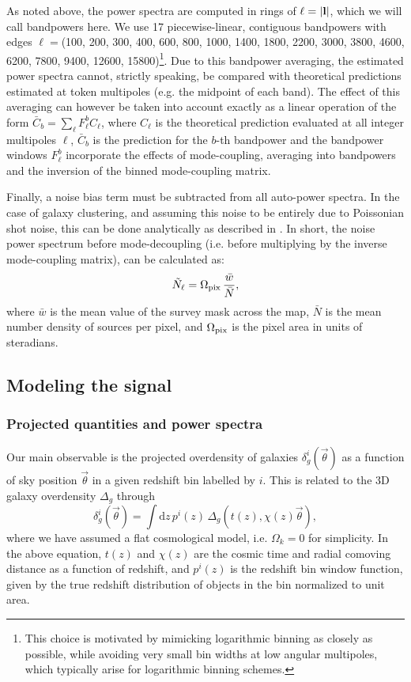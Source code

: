 \documentclass[a4paper,11pt]{article}
\newcommand{\nv}{\vec{\theta}}
\begin{document}
    As noted above, the power spectra are computed in rings of $\ell=|{\bf l}|$, which we will call bandpowers here. We use 17 piecewise-linear, contiguous bandpowers with edges $\ell=$(100, 200, 300, 400, 600, 800, 1000, 1400, 1800, 2200, 3000, 3800, 4600, 6200, 7800, 9400, 12600, 15800)\footnote{This choice is motivated by mimicking logarithmic binning as closely as possible, while avoiding very small bin widths at low angular multipoles, which typically arise for logarithmic binning schemes.}. Due to this bandpower averaging, the estimated power spectra cannot, strictly speaking, be compared with theoretical predictions estimated at token multipoles (e.g. the midpoint of each band). The effect of this averaging can however be taken into account exactly as a linear operation of the form $\bar{C}_b=\sum_\ell F^b_{\ell} C_\ell$, where $C_\ell$ is the theoretical prediction evaluated at all integer multipoles $\ell$, $\bar{C}_b$ is the prediction for the $b$-th bandpower and the bandpower windows $F^b_{\ell}$ incorporate the effects of mode-coupling, averaging into bandpowers and the inversion of the binned mode-coupling matrix.
    
    Finally, a noise bias term must be subtracted from all auto-power spectra. In the case of galaxy clustering, and assuming this noise to be entirely due to Poissonian shot noise, this can be done analytically as described in \cite{2019MNRAS.484.4127A}. In short, the noise power spectrum before mode-decoupling (i.e. before multiplying by the inverse mode-coupling matrix), can be calculated as:
    \begin{equation}\label{eq:nell}
      \tilde{N}_\ell = \Omega_{\rm pix}\,\frac{\bar{w}}{\bar{N}},
    \end{equation}
    where $\bar{w}$ is the mean value of the survey mask across the map, $\bar{N}$ is the mean number density of sources per pixel, and $\Omega_{\rm pix}$ is the pixel area in units of steradians.

  \subsection{Modeling the signal}\label{ssec:methods.theory}
  \subsubsection{Projected quantities and power spectra}\label{sssec:methods.theory.cellpk}
    Our main observable is the projected overdensity of galaxies $\delta^i_g(\nv)$ as a function of sky position $\nv$ in a given redshift bin labelled by $i$. This is related to the 3D galaxy overdensity $\Delta_g$ through
    \begin{equation}
      \delta^i_g(\nv)=\int \mathrm{d}z\,p^i(z)\,\Delta_g\left(t(z),\chi(z)\nv\right),
    \end{equation}
where we have assumed a flat cosmological model, i.e. $\Omega_{k} = 0$ for simplicity.
    In the above equation, $t(z)$ and $\chi(z)$ are the cosmic time and radial comoving distance as a function of redshift, and $p^i(z)$ is the redshift bin window function, given by the true redshift distribution of objects in the bin normalized to unit area.
  
\end{document}
